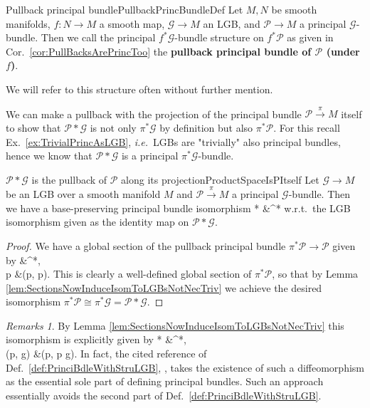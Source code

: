 \documentclass[a4paper,oneside,11pt,bibliography=totoc]{scrartcl}
\def\bas#1\eas{\begin{align*}#1\end{align*}}
\theoremstyle{plain}
\theoremstyle{remark}
\newtheorem{remark}[theorem]{Remarks}
\theoremstyle{definition}
\begin{document}
\begin{definitions}{Pullback principal bundle}{PullbackPrincBundleDef}
Let $M, N$ be smooth manifolds, $f: N \to M$ a smooth map, $\mathcal{G} \to M$ an LGB, and $\mathcal{P} \to M$ a principal $\mathcal{G}$-bundle. Then we call the principal $f^*\mathcal{G}$-bundle structure on $f^*\mathcal{P}$ as given in Cor.\ \ref{cor:PullBacksArePrincToo} the \textbf{pullback principal bundle of $\mathcal{P}$ (under $f$)}.

We will refer to this structure often without further mention.
\end{definitions}

We can make a pullback with the projection of the principal bundle $\mathcal{P} \stackrel{\pi}{\to} M$ itself to show that $\mathcal{P}*\mathcal{G}$ is not only $\pi^*\mathcal{G}$ by definition but also $\pi^*\mathcal{P}$. For this recall Ex.\ \ref{ex:TrivialPrincAsLGB}, \textit{i.e.}\ LGBs are "trivially" also principal bundles, hence we know that $\mathcal{P} * \mathcal{G}$ is a principal $\pi^*\mathcal{G}$-bundle.

\begin{corollaries}{$\mathcal{P}*\mathcal{G}$ is the pullback of $\mathcal{P}$ along its projection}{ProductSpaceIsPItself}
Let $\mathcal{G} \to M$ be an LGB over a smooth manifold $M$ and $\mathcal{P} \stackrel{\pi}{\to} M$ a principal $\mathcal{G}$-bundle. Then we have a base-preserving principal bundle isomorphism 
\bas
\mathcal{P}* &\cong \pi^*
\eas
w.r.t.\ the LGB isomorphism given as the identity map on $\mathcal{P} * \mathcal{G}$.
\end{corollaries}

\begin{proof}
\leavevmode\newline
We have a global section of the pullback principal bundle $\pi^*\mathcal{P} \to \mathcal{P}$ given by
\bas
\mathcal{P} &\to \pi^*,\\
p &\mapsto (p, p).
\eas
This is clearly a well-defined global section of $\pi^*\mathcal{P}$, so that by Lemma \ref{lem:SectionsNowInduceIsomToLGBsNotNecTriv} we achieve the desired isomorphism $\pi^*\mathcal{P} \cong \pi^*\mathcal{G} = \mathcal{P} * \mathcal{G}$.
\end{proof}

\begin{remark}\label{AlternativePrincBdlDef}
\leavevmode\newline
By Lemma \ref{lem:SectionsNowInduceIsomToLGBsNotNecTriv} this isomorphism is explicitly given by
\bas
\mathcal{P}* &\to \pi^*,\\
(p, g) &\mapsto (p, p \cdot g).
\eas
In fact, the cited reference of Def.\ \ref{def:PrinciBdleWithStruLGB}, \cite[simplification of the beginning of \S 5.7, page 144f.]{GroupoidBasedPrincipalBundles}, takes the existence of such a diffeomorphism as the essential sole part of defining principal bundles. Such an approach essentially avoids the second part of Def.\ \ref{def:PrinciBdleWithStruLGB}.
\end{remark}
\end{document}
